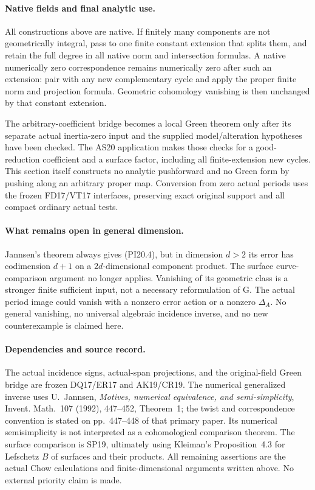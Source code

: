 \paragraph{Native fields and final analytic use.}
All constructions above are native.  If finitely many components
are not geometrically integral, pass to one finite constant
extension that splits them, and retain the full degree in all
native norm and intersection formulas.  A native numerically
zero correspondence remains numerically zero after such an
extension: pair with any new complementary cycle and apply the
proper finite norm and projection formula.  Geometric cohomology
vanishing is then unchanged by that constant extension.

The arbitrary-coefficient bridge becomes a local Green theorem
only after its separate actual inertia-zero input and the
supplied model/alteration hypotheses have been checked.  The
AS20 application makes those checks for a good-reduction
coefficient and a surface factor, including all finite-extension
new cycles.  This section itself constructs no analytic pushforward
and no Green form by pushing along an arbitrary proper map.
Conversion from zero actual periods uses the frozen FD17/VT17
interfaces, preserving exact original support and all compact
ordinary actual tests.

\paragraph{What remains open in general dimension.}
Jannsen's theorem always gives (PI20.4), but in dimension $d>2$
its error has codimension $d+1$ on a $2d$-dimensional component
product.  The surface curve-comparison argument no longer
applies.  Vanishing of its geometric class is a stronger finite
sufficient input, not a necessary reformulation of G.  The
actual period image could vanish with a nonzero error action or
a nonzero $\Delta_A$.  No general vanishing, no universal
algebraic incidence inverse, and no new counterexample is
claimed here.

\paragraph{Dependencies and source record.}
The actual incidence signs, actual-span projections, and the
original-field Green bridge are frozen DQ17/ER17 and AK19/CR19.
The numerical generalized inverse uses U.~Jannsen,
\emph{Motives, numerical equivalence, and semi-simplicity},
Invent. Math.\ 107 (1992), 447--452, Theorem~1; the twist and
correspondence convention is stated on pp.~447--448 of that
primary paper.  Its numerical semisimplicity is not interpreted
as a cohomological comparison theorem.  The surface comparison
is SP19, ultimately using Kleiman's Proposition~4.3 for Lefschetz
$B$ of surfaces and their products.  All remaining assertions
are the actual Chow calculations and finite-dimensional arguments
written above.  No external priority claim is made.
